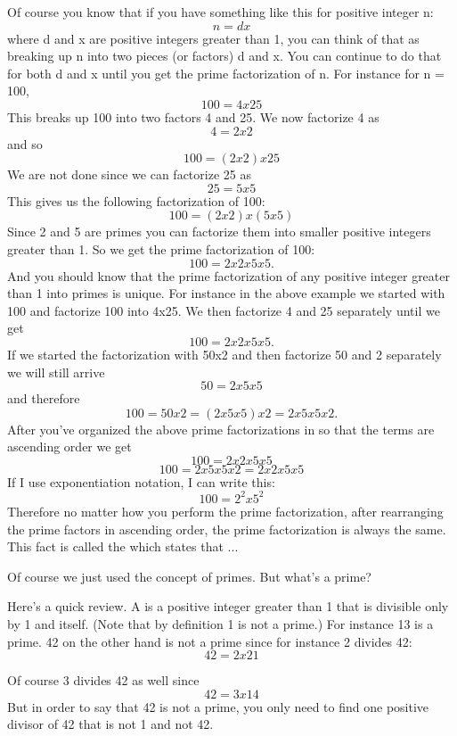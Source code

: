Of course you know that if you have something like this for positive
integer n:
\[n = dx\]
where d and x are positive integers greater than 1, you can think of that
as breaking up n into two pieces (or factors) d and x. You can continue to
do that for both d and x until you get the prime factorization of n. For
instance for n = 100,
\[100 = 4 x 25\]
This breaks up 100 into two factors 4 and 25. We now factorize 4 as
\[4 = 2x2\]
and so
\[100 = (2x2)x25\]
We are not done since we can factorize 25 as
\[25 = 5x5\]
This gives us the following factorization of 100:
\[100 = (2x2)x(5x5)\]
Since 2 and 5 are primes you can factorize them into smaller positive
integers greater than 1. So we get the prime factorization of 100:
\[100 = 2x2x5x5.\]
And you should know that the prime factorization of any positive integer
greater than 1 into primes is unique. For instance in the above example
we started with 100 and factorize 100 into 4x25. We then factorize 4 and
25 separately until we get
\[100 = 2x2x5x5.\]
If we started the factorization with 50x2 and then factorize 50 and 2
separately we will still arrive
\[50 = 2x5x5\]
and therefore
\[100 = 50x2 = (2x5x5)x2 = 2x5x5x2.\]
After you've organized the above prime factorizations in so that the terms
are ascending order we get
\[100 = 2x2x5x5\]
\[100 = 2x5x5x2 = 2x2x5x5\]
If I use exponentiation notation, I can write this:
\[100 = 2^2 x 5^2\]
Therefore no matter how you perform the prime factorization, after
rearranging the prime factors in ascending order, the prime factorization
is always the same. This fact is called the  which states that ...


%
%

Of course we just used the concept of primes. But what's a prime?

Here's a quick review. A  is a positive integer greater than 1 that is divisible only by 1 and itself. (Note that by definition 1 is not a prime.) For instance 13 is a prime. 42 on the other hand is not a prime since for instance 2 divides 42:
\[42 = 2 x 21\]

Of course 3 divides 42 as well since
\[42 = 3 x 14\]
But in order to say that 42 is not a prime, you only need to find one
positive divisor of 42 that is not 1 and not 42.

